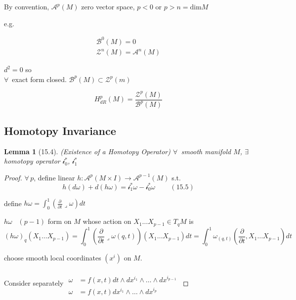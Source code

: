 \documentclass[11pt]{amsart}
\newtheorem{lemma}{Lemma}
\theoremstyle{definition}
\begin{document}
By convention, $\mathcal{A}^p(M)$ zero vector space, $p < 0$ or $p>n = \text{dim}{M}$

e.g.

\[
\begin{aligned}
  \mathcal{B}^0(M)=0 \\
  \mathcal{Z}^n(M) = \mathcal{A}^n(M)
\end{aligned}
\]

$d^2=0$ so \\
$\forall \, $ exact form closed.  $\mathcal{B}^p(M) \subset \mathcal{Z}^p(m)$

\[
H^p_{dR}(M) = \frac{\mathcal{Z}^p(M)}{ \mathcal{B}^p(M) }
\]


\subsection*{Homotopy Invariance}

\begin{lemma}[15.4] (Existence of a Homotopy Operator)
  $\forall \, $ smooth manifold $M$, $\exists \, $ homotopy operator $\mathcal{i}_0^*$, $\mathcal{i}^*_1$
\end{lemma}

\begin{proof} $\forall \, p$, define linear $h: \mathcal{A}^p(M\times I) \to \mathcal{A}^{p -1}(M)$ s.t.
\begin{equation}
h(d\omega ) + d(h \omega) = \mathcal{i}^*_1 \omega - \mathcal{i}_0^*\omega  \quad \quad \, (15.5)
\end{equation}


define $h\omega = \int_0^1 \left( \frac{ \partial }{\partial t} \lrcorner \omega \right) dt$


$h \omega$ \, $(p-1)$ form on $M$ whose action on $X_1 \dots X_{p-1} \in T_qM$ is
\[
(h\omega)_q(X_1  \dots X_{p-1}) = \int_0^1 \left( \frac{ \partial }{ \partial t} \lrcorner \omega(q,t) \right)(X_1 \dots X_{p-1} ) dt = \int_0^1 \omega_{(q,t)}\left( \frac{ \partial}{\partial t}, X_1 \dots X_{p-1} \right) dt
\]

choose smooth local coordinates $(x^i)$ on $M$.

Consider separately $\begin{aligned} & \quad \\
  \omega  & = f(x,t) dt \wedge dx^{i_1} \wedge \dots \wedge dx^{i_{p-1} } \\
  \omega & = f(x,t) dx^{i_1} \wedge \dots \wedge dx^{i_p } \end{aligned}$


\end{proof}

\end{document}
